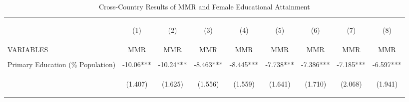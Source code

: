 \begin{landscape}\begin{table}[htpb!]\begin{center}\caption{Cross-Country Results of MMR and Female Educational Attainment}\label{MMRtab:MMRpercent}\begin{tabular}{lcccccccc}\toprule&\begin{footnotesize}(1)\end{footnotesize}&\begin{footnotesize}(2)\end{footnotesize}&\begin{footnotesize}(3)\end{footnotesize}&\begin{footnotesize}(4)\end{footnotesize}&\begin{footnotesize}(5)\end{footnotesize}&\begin{footnotesize}(6)\end{footnotesize}&\begin{footnotesize}(7)\end{footnotesize}&\begin{footnotesize}(8) \end{footnotesize}\\
VARIABLES&MMR&MMR&MMR&MMR&MMR&MMR&MMR&MMR\\ \midrule
&&&&&&&&\\
Primary Education (\% Population) &-10.06***&-10.24***&-8.463***&-8.445***&-7.738***&-7.386***&-7.185***&-6.597***\\
&\begin{footnotesize}(1.407)\end{footnotesize}&\begin{footnotesize}(1.625)\end{footnotesize}&\begin{footnotesize}(1.556)\end{footnotesize}&\begin{footnotesize}(1.559)\end{footnotesize}&\begin{footnotesize}(1.641)\end{footnotesize}&\begin{footnotesize}(1.710)\end{footnotesize}&\begin{footnotesize}(2.068)\end{footnotesize}&\begin{footnotesize}(1.941)\end{footnotesize}\\

\end{tabular}
\end{center}
\end{table}
\end{landscape}
